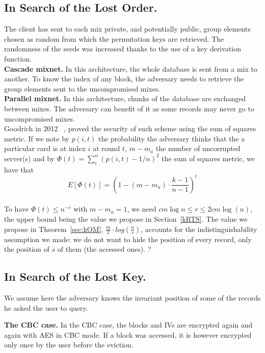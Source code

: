 \documentclass{llncs}
\begin{document}
\subsection{In Search of the Lost Order.}
The client has sent to each mix private, and potentially public, group elements chosen as random from which the permutation keys are retrieved. The randomness of the seeds was increased thanks to the use of a key derivation function.\\

\noindent\textbf{Cascade mixnet.}
In this architecture, the whole database is sent from a mix to another. To know the index of any block, the adversary needs to retrieve the group elements sent to the uncompromised mixes. \\

\noindent\textbf{Parallel mixnet.}
In this architecture, chunks of the database are exchanged between mixes. The adversary can benefit of it as some records may never go to uncompromised mixes.\\
Goodrich in 2012 ~\cite{goodrich2012anonymous}, proved the security of such scheme using the sum of squares metric. If we note by $p(i,t)$ the probability the adversary thinks that the a particular card is at index $i$ at round $t$, $m-m_a$ the number of uncorrupted server(s) and by $\Phi(t)= \sum_{i}^{n}\left (p(i,t) - 1/n \right)^2$ the sum of squares metric, we have that $$E[\Phi(t)] = \left (1 - (m-m_a) \cdot \frac{k-1}{n-1}\right )^{t}$$\\
To have $\Phi(t) \leq n^{-c}$ with $m-m_a=1$, we need $cm \log n \leq r \leq 2cm \log(n)$, the upper bound being the value we propose in Section~\ref{kRTS}. The value we propose in Theorem~\ref{sec:kOM}, $\frac{m}{2} \cdot log\left ( \frac{n}{s} \right )$, accounts for the indistinguishability assumption we made: we do not want to hide the position of every record, only the position of $s$ of them (the accessed ones). ?

\subsection{In Search of the Lost Key.}
We assume here the adversary knows the invariant position of some of the records he asked the user to query. 

\noindent\textbf{The CBC case.}
In the CBC case, the blocks and IVs are encrypted again and again with AES in CBC mode. If a block was accessed, it is however encrypted only once by the user before the eviction.\\
\end{document}
